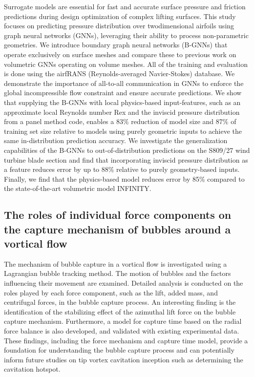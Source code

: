 \documentclass[a4paper,10pt]{article}
\begin{document}
Surrogate models are essential for fast and accurate surface pressure and friction predictions during design
optimization of complex lifting surfaces. This study focuses on predicting pressure distribution over twodimensional airfoils using graph neural networks (GNNs), leveraging their ability to process non-parametric geometries. We introduce boundary graph neural networks (B-GNNs) that operate exclusively on surface meshes
and compare these to previous work on volumetric GNNs operating on volume meshes. All of the training
and evaluation is done using the airfRANS (Reynolds-averaged Navier-Stokes) database. We demonstrate
the importance of all-to-all communication in GNNs to enforce the global incompressible flow constraint and
ensure accurate predictions. We show that supplying the B-GNNs with local physics-based input-features, such
as an approximate local Reynolds number Rex and the inviscid pressure distribution from a panel method code,
enables a 83\% reduction of model size and 87\% of training set size relative to models using purely geometric
inputs to achieve the same in-distribution prediction accuracy. We investigate the generalization capabilities of
the B-GNNs to out-of-distribution predictions on the S809/27 wind turbine blade section and find that incorporating inviscid pressure distribution as a feature reduces error by up to 88\% relative to purely geometry-based inputs. Finally, we find that the physics-based model reduces error by 85\% compared to the state-of-the-art volumetric model INFINITY.

\subsection{The roles of individual force components on the capture mechanism of bubbles around a vortical flow \cite{huang_roles_2024}}

The mechanism of bubble capture in a vortical flow is investigated using a Lagrangian bubble tracking method. The motion of bubbles and the factors influencing their movement are examined. Detailed analysis is conducted on the roles played by each force component, such as the lift, added mass, and centrifugal forces, in the bubble capture process. An interesting finding is the identification of the stabilizing effect of the azimuthal lift force on the bubble capture mechanism. Furthermore, a model for capture time based on the radial force balance is also developed, and validated with existing experimental data. These findings, including the force mechanism and capture time model, provide a foundation for understanding the bubble capture process and can potentially inform future studies on tip vortex cavitation inception such as determining the cavitation hotspot.
	
\end{document}

